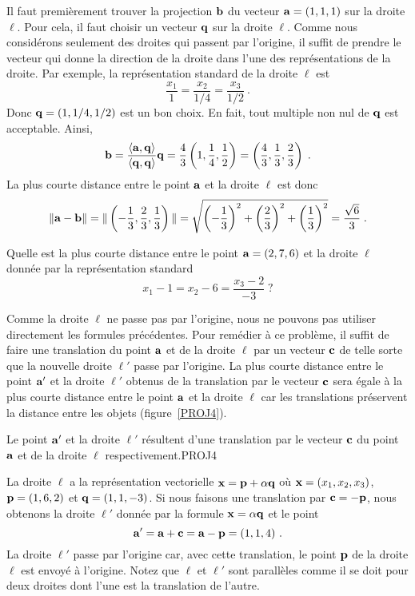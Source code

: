 {\begin{egg}
Il faut premièrement trouver la projection $\mathbf{b}$ du vecteur
$\mathbf{a} = (1,1,1)$ sur la droite $\ell$.  Pour cela, il faut choisir un
vecteur $\mathbf{q}$ sur la droite $\ell$.  Comme nous considérons seulement
des droites qui passent par l'origine, il suffit de prendre le vecteur
qui donne la direction de la droite dans l'une des représentations de
la droite.  Par exemple, la représentation standard de la droite
$\ell$ est
\[
  \frac{x_1}{1} = \frac{x_2}{1/4} = \frac{x_3}{1/2} \ .
\]
Donc $\mathbf{q} = \left(1, 1/4, 1/2\right)$ est un bon choix.  En fait,
tout multiple non nul de $\mathbf{q}$ est acceptable.  Ainsi,
\[
\mathbf{b} = \frac{\left\langle{\mathbf{a}} , {\mathbf{q}}\right\rangle}{\left\langle{\mathbf{q}} , {\mathbf{q}}\right\rangle} \mathbf{q}
= \frac{4}{3} \left(1, \frac{1}{4}, \frac{1}{2}\right)
= \left(\frac{4}{3}, \frac{1}{3},\frac{2}{3} \right) \; .
\]
La plus courte distance entre le point $\mathbf{a}$ et la droite $\ell$
est donc
\[
\|\mathbf{a}-\mathbf{b}\| =
\| \left(-\frac{1}{3}, \frac{2}{3},\frac{1}{3} \right) \|
= \sqrt{ \left(-\frac{1}{3}\right)^2 + \left(\frac{2}{3}\right)^2
+ \left(\frac{1}{3}\right)^2}
= \frac{\sqrt{6}}{3} \; .
\]
\end{egg}

\begin{egg}
Quelle est la plus courte distance entre le point $\mathbf{a}=(2,7,6)$ et
la droite $\ell$ donnée par la représentation standard
\[
x_1 - 1 = x_2 - 6 = \frac{x_3 - 2}{-3} \; ?
\]

Comme la droite $\ell$ ne passe pas par l'origine, nous
ne pouvons pas utiliser directement les formules précédentes.  Pour
remédier à ce problème, il suffit de faire une translation du point $\mathbf{a}$
et de la droite $\ell$ par un vecteur $\mathbf{c}$ de telle sorte que la
nouvelle droite $\ell'$ passe par l'origine.  La plus courte distance
entre le point $\mathbf{a}'$ et la droite $\ell'$ obtenus de la
translation par le vecteur $\mathbf{c}$ sera égale à la plus courte
distance entre le point $\mathbf{a}$ et la droite $\ell$ car les 
translations préservent la distance entre les objets (figure~\ref{PROJ4}).

{Le point $\mathbf{a}'$ et la droite $\ell'$ résultent d'une translation
par le vecteur $\mathbf{c}$ du point $\mathbf{a}$ et de la droite $\ell$
respectivement.}{PROJ4}

La droite $\ell$ a la représentation vectorielle
$\mathbf{x} = \mathbf{p} + \alpha \mathbf{q}$ où $\mathbf{x} = (x_1,x_2,x_3)$,
$\mathbf{p} = (1,6,2)$ et $\mathbf{q} = (1,1,-3)$.  Si nous faisons une
translation par $\mathbf{c} = - \mathbf{p}$, nous obtenons la droite $\ell'$
donnée par la formule $\mathbf{x} = \alpha \mathbf{q}$ et le point
\[
\mathbf{a}' = \mathbf{a} + \mathbf{c} = \mathbf{a} - \mathbf{p} = (1,1,4) \ .
\]
La droite $\ell'$ passe par l'origine car, avec cette translation, le
point $\mathbf{p}$ de la droite $\ell$ est envoyé à l'origine.
Notez que $\ell$ et $\ell'$ sont parallèles comme il se doit pour deux
droites dont l'une est la translation de l'autre.


\end{egg}}

